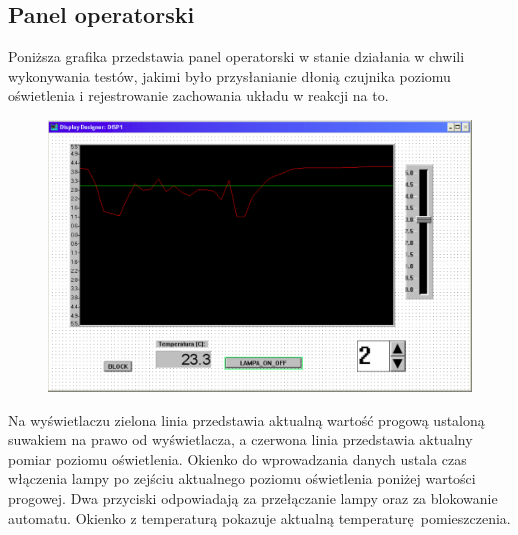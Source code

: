 \documentclass[a4paper, 12pt]{article}
\begin{document}
		\subsection{Panel operatorski}
			Poniższa grafika przedstawia panel operatorski w stanie działania w chwili wykonywania testów, jakimi było przysłanianie dłonią czujnika poziomu oświetlenia i rejestrowanie zachowania układu w reakcji na to.
			\begin{figure}[H]
				\centering
				\includegraphics[width =\textwidth]{./img/przebieg.png}
			\end{figure}
			\noindent Na wyświetlaczu zielona linia przedstawia aktualną wartość progową ustaloną suwakiem na prawo od wyświetlacza, a czerwona linia przedstawia aktualny pomiar poziomu oświetlenia. Okienko do wprowadzania danych ustala czas włączenia lampy po zejściu aktualnego poziomu oświetlenia poniżej wartości progowej. Dwa przyciski odpowiadają za przełączanie lampy oraz za blokowanie automatu. Okienko z temperaturą pokazuje aktualną temperaturę pomieszczenia.
\end{document}
